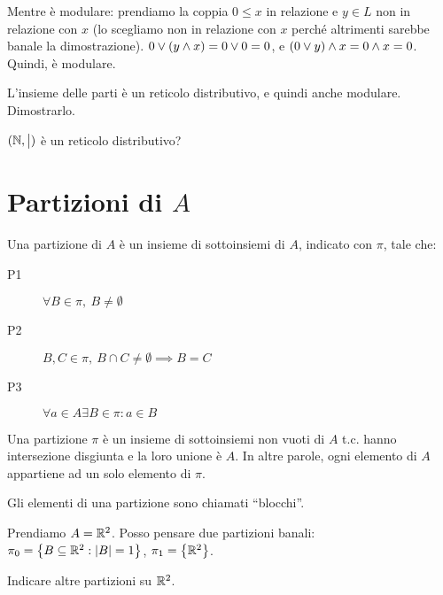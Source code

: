 Mentre \`e modulare: prendiamo la coppia $0 \le x$ in relazione e $y \in L$ non in relazione con $x$ (lo scegliamo non in relazione con $x$ perch\'e altrimenti sarebbe banale la dimostrazione). $ 0 \vee (y \wedge x) = 0 \vee 0 = 0$, e $(0 \vee y) \wedge x = 0 \wedge x = 0$. Quindi, \`e modulare.

\begin{esercizio}
L'insieme delle parti \`e un reticolo distributivo, e quindi anche modulare. Dimostrarlo.

\vspace{5cm}
\end{esercizio}

\begin{esercizio}
$(\mathbb{N}, \bigm|)$ \`e un reticolo distributivo?

\vspace{5cm}
\end{esercizio}


\section{Partizioni di $A$}

\begin{defn}[Partizione]\label{partizione}
Una partizione di $A$ \`e un insieme di sottoinsiemi di $A$, indicato con $\pi$, tale che:
\begin{description}
  \item[P1\label{itm:P1}] $\forall B \in \pi , \ B \neq \emptyset$
  \item[P2\label{itm:P2}] $B, C \in \pi , \ B \cap C \neq \emptyset \implies B = C$
  \item[P3\label{itm:P3}] $\forall a \in A \exists B \in \pi : a \in B$
\end{description}
\end{defn}
Una partizione $\pi$ \`e un insieme di sottoinsiemi non vuoti di $A$ t.c. hanno intersezione disgiunta e la loro unione \`e $A$. In altre parole, ogni elemento di $A$ appartiene ad un solo elemento di $\pi$.

Gli elementi di una partizione sono chiamati ``blocchi''.

Prendiamo $A = \mathbb{R}^2$. Posso pensare due partizioni banali: $\pi_0 = \left\{ B \subseteq \mathbb{R}^2 : \left\lvert{B}\right\rvert = 1 \right\}$, $\pi_1 = \left\{ \mathbb{R}^2 \right \}$.

\begin{esercizio}
Indicare altre partizioni su $\mathbb{R}^2$.

\vspace{5cm}
\end{esercizio}

